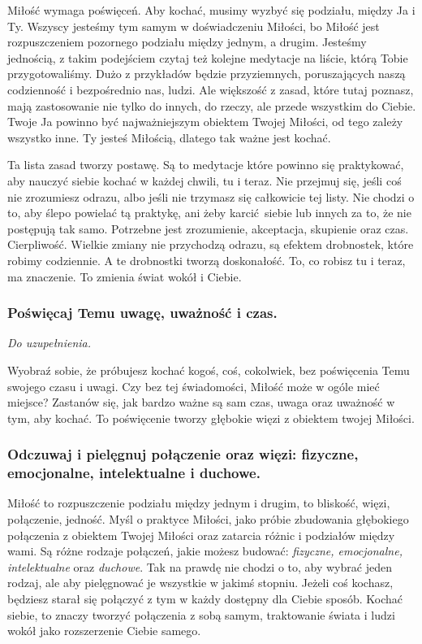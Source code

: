 Miłość wymaga poświęceń. 
Aby kochać, musimy wyzbyć się podziału, między Ja i Ty.
Wszyscy jesteśmy tym samym w doświadczeniu Miłości, bo Miłość jest rozpuszczeniem pozornego podziału między jednym, a drugim.
Jesteśmy jednością, z takim podejściem czytaj też kolejne medytacje na liście, którą Tobie przygotowaliśmy.
Dużo z przykładów będzie przyziemnych, poruszających naszą codzienność i bezpośrednio nas, ludzi.
Ale większość z zasad, które tutaj poznasz, mają zastosowanie nie tylko do innych, do rzeczy, ale przede wszystkim do Ciebie. Twoje Ja powinno być najważniejszym obiektem Twojej Miłości, od tego zależy wszystko inne.
Ty jesteś Miłością, dlatego tak ważne jest kochać.

Ta lista zasad tworzy postawę. 
Są to medytacje które powinno się praktykować, aby nauczyć siebie kochać w każdej chwili, tu i teraz.
Nie przejmuj się, jeśli coś nie zrozumiesz odrazu, albo jeśli nie trzymasz się całkowicie tej listy.
Nie chodzi o to, aby ślepo powielać tą praktykę, ani żeby karcić siebie lub innych za to, że nie postępują tak samo.
Potrzebne jest zrozumienie, akceptacja, skupienie oraz czas. Cierpliwość.
Wielkie zmiany nie przychodzą odrazu, są efektem drobnostek, które robimy codziennie.
A te drobnostki tworzą doskonałość.
To, co robisz tu i teraz, ma znaczenie. 
To zmienia świat wokół i Ciebie.

\ornamentbreak

\subsubsection{Poświęcaj Temu uwagę, uważność i czas.}
\emph{Do uzupełnienia.}

Wyobraź sobie, że próbujesz kochać kogoś, coś, cokolwiek, bez poświęcenia Temu swojego czasu i uwagi.
Czy bez tej świadomości, Miłość może w ogóle mieć miejsce?
Zastanów się, jak bardzo ważne są sam czas, uwaga oraz uważność w tym, aby kochać.
To poświęcenie tworzy głębokie więzi z obiektem twojej Miłości.

\subsubsection{Odczuwaj i pielęgnuj połączenie oraz więzi: fizyczne, emocjonalne, intelektualne i duchowe.}
Miłość to rozpuszczenie podziału między jednym i drugim, to bliskość, więzi, połączenie, jedność.
Myśl o praktyce Miłości, jako próbie zbudowania głębokiego połączenia z obiektem Twojej Miłości oraz zatarcia różnic i podziałów między wami.
Są różne rodzaje połączeń, jakie możesz budować: \emph{fizyczne, emocjonalne, intelektualne} oraz \emph{duchowe}.
Tak na prawdę nie chodzi o to, aby wybrać jeden rodzaj, ale aby pielęgnować je wszystkie w jakimś stopniu.
Jeżeli coś kochasz, będziesz starał się połączyć z tym w każdy dostępny dla Ciebie sposób.
Kochać siebie, to znaczy tworzyć połączenia z sobą samym, traktowanie świata i ludzi wokół jako rozszerzenie Ciebie samego.

